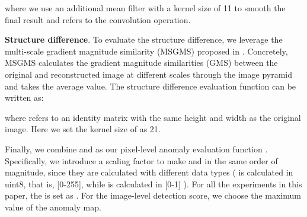 \documentclass[5p, twocolumn]{elsarticle}[draft]
\begin{document}
where we use an additional mean filter  with a kernel size of 11 to smooth the final result and  refers to the convolution operation.

\textbf{Structure difference}. To evaluate the structure difference, we leverage the multi-scale gradient magnitude similarity (MSGMS) proposed in \cite{zavrtanik2021reconstruction}. Concretely, MSGMS calculates the gradient magnitude similarities (GMS) \cite{xue2013gradient} between the original and reconstructed image at different scales through the image pyramid and takes the average value. The structure difference evaluation function can be written as:

where  refers to an identity matrix with the same height  and width  as the original image. Here we set the kernel size of  as 21.

Finally, we combine  and  as our pixel-level anomaly evaluation function . Specifically, we introduce a scaling factor  to make  and  in the same order of magnitude, since they are calculated with different data types (  is calculated in uint8, that is, [0-255], while  is calculated in [0-1] ). For all the experiments in this paper, the  is set as . For the image-level detection score, we choose the maximum value of the anomaly map.
\end{document}
